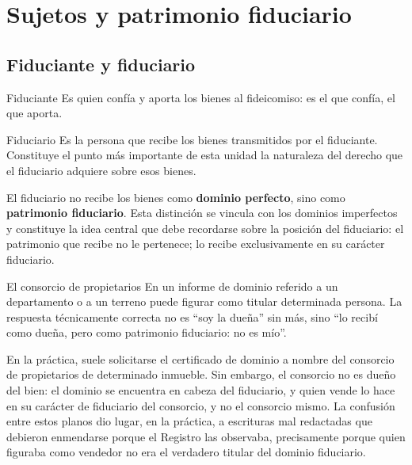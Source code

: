 \documentclass[12pt,oneside]{book}
\begin{document}
\chapter{Sujetos y patrimonio fiduciario}

\section{Fiduciante y fiduciario}

\begin{definition}{Fiduciante}
Es quien confía y aporta los bienes al fideicomiso: es el que confía, el que aporta.
\end{definition}

\begin{definition}{Fiduciario}
Es la persona que recibe los bienes transmitidos por el fiduciante. Constituye el punto más importante de esta unidad la naturaleza del derecho que el fiduciario adquiere sobre esos bienes.
\end{definition}

\begin{important}
El fiduciario no recibe los bienes como \textbf{dominio perfecto}, sino como \textbf{patrimonio fiduciario}. Esta distinción se vincula con los dominios imperfectos y constituye la idea central que debe recordarse sobre la posición del fiduciario: el patrimonio que recibe no le pertenece; lo recibe exclusivamente en su carácter fiduciario.
\end{important}

\begin{example}{El consorcio de propietarios}
En un informe de dominio referido a un departamento o a un terreno puede figurar como titular determinada persona. La respuesta técnicamente correcta no es ``soy la dueña'' sin más, sino ``lo recibí como dueña, pero como patrimonio fiduciario: no es mío''.

En la práctica, suele solicitarse el certificado de dominio a nombre del consorcio de propietarios de determinado inmueble. Sin embargo, el consorcio no es dueño del bien: el dominio se encuentra en cabeza del fiduciario, y quien vende lo hace en su carácter de fiduciario del consorcio, y no el consorcio mismo. La confusión entre estos planos dio lugar, en la práctica, a escrituras mal redactadas que debieron enmendarse porque el Registro las observaba, precisamente porque quien figuraba como vendedor no era el verdadero titular del dominio fiduciario.
\end{example}
\end{document}
